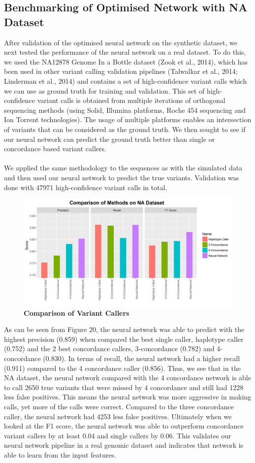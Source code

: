 \documentclass{article}
\begin{document}
\subsection{Benchmarking of Optimised Network with NA Dataset}
After validation of the optimised neural network on the synthetic dataset, we next tested the performance of the neural network on a real dataset. To do this, we used the NA12878 Genome In a Bottle dataset (Zook et al., 2014), which has been used in other variant calling validation pipelines (Talwalkar et al., 2014; Linderman et al., 2014) and contains a set of high-confidence variant calls which we can use as ground truth for training and validation. This set of high-confidence variant calls is obtained from multiple iterations of orthogonal sequencing methods (using Solid, Illumina platforms, Roche 454 sequencing and Ion Torrent technologies). The usage of multiple platforms enables an intersection of variants that can be considered as the ground truth. We then sought to see if our neural network can predict the ground truth better than single or concordance based variant callers. \\\\We applied the same methodology to the sequences as with the simulated data and then used our neural network to predict the true variants. Validation was done with 47971 high-confidence variant calls in total.
\begin{figure}[H]
\includegraphics[width=\textwidth]{naheadsupcomparison.jpg}
\caption{\textbf{Comparison of Variant Callers}}
\centering
\end{figure}
As can be seen from Figure 20, the neural network was able to predict with the highest precision (0.859) when compared the best single caller, haplotype caller (0.752) and the 2 best concordance callers, 3-concordance (0.782) and 4-concordance (0.830). In terms of recall, the neural network had a higher recall (0.911) compared to the 4 concordance caller (0.856). Thus, we see that in the NA dataset, the neural network compared with the 4 concordance network is able to call 2650 true variants that were missed by 4 concordance and still had 1228 less false positives. This means the neural network was more aggressive in making calls, yet more of the calls were correct. Compared to the three concordance caller, the neural network had 4253 less false positives. Ultimately when we looked at the F1 score, the neural network was able to outperform concordance variant callers by at least 0.04 and single callers by 0.06. This validates our neural network pipeline in a real genomic dataset and indicates that network is able to learn from the input features.
\newpage
\end{document}

